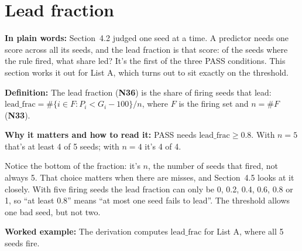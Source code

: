 \documentclass[11pt,a4paper,oneside,openany]{report}
\newcommand{\leadfrac}{\mathrm{lead\_frac}}
\newcommand{\gl}[1]{\textbf{#1}}   %
\newcommand{\fplain}{\textbf{In plain words:} }
\newcommand{\fdef}{\textbf{Definition:} }
\newcommand{\fread}{\par\textbf{Why it matters and how to read it:} }
\newcommand{\fex}{\par\textbf{Worked example:} }
\begin{document}
\section{Lead fraction}
\fplain Section~4.2 judged one seed at a time. A predictor needs one score across all its seeds, and the lead fraction is that score: of the seeds where the rule fired, what share led? It's the first of the three PASS conditions. This section works it out for List A, which turns out to sit exactly on the threshold.

\fdef The lead fraction (\gl{N36}) is the share of firing seeds that lead: $\leadfrac = \#\{i \in F : P_i < G_i - 100\} / n$, where $F$ is the firing set and $n = \#F$ (\gl{N33}).
\fread PASS needs $\leadfrac \ge 0.8$. With $n = 5$ that's at least 4 of 5 seeds; with $n = 4$ it's 4 of 4.

Notice the bottom of the fraction: it's $n$, the number of seeds that fired, not always 5. That choice matters when there are misses, and Section~4.5 looks at it closely. With five firing seeds the lead fraction can only be 0, 0.2, 0.4, 0.6, 0.8 or 1, so ``at least 0.8'' means ``at most one seed fails to lead''. The threshold allows one bad seed, but not two.

\fex The derivation computes $\leadfrac$ for List A, where all 5 seeds fire.
\end{document}
